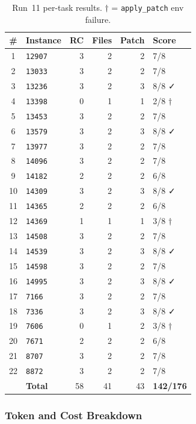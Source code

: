 \begin{table}[h]
\centering
\small
\caption{Run~11 per-task results.  $\dagger$ = \texttt{apply\_patch} env failure.}\label{tab:r11-tasks}
\setlength{\tabcolsep}{4pt}
\begin{tabular}{clrrrl}
\toprule
\textbf{\#} & \textbf{Instance} & \textbf{RC} & \textbf{Files} & \textbf{Patch} & \textbf{Score} \\
\midrule
 1 & \texttt{12907} & 3 & 2 & 2 & 7/8 \\
 2 & \texttt{13033} & 3 & 2 & 2 & 7/8 \\
 3 & \texttt{13236} & 3 & 2 & 3 & 8/8 ✓ \\
 4 & \texttt{13398} & 0 & 1 & 1 & 2/8 $\dagger$ \\
 5 & \texttt{13453} & 3 & 2 & 2 & 7/8 \\
 6 & \texttt{13579} & 3 & 2 & 3 & 8/8 ✓ \\
 7 & \texttt{13977} & 3 & 2 & 2 & 7/8 \\
 8 & \texttt{14096} & 3 & 2 & 2 & 7/8 \\
 9 & \texttt{14182} & 2 & 2 & 2 & 6/8 \\
10 & \texttt{14309} & 3 & 2 & 3 & 8/8 ✓ \\
11 & \texttt{14365} & 2 & 2 & 2 & 6/8 \\
12 & \texttt{14369} & 1 & 1 & 1 & 3/8 $\dagger$ \\
13 & \texttt{14508} & 3 & 2 & 2 & 7/8 \\
14 & \texttt{14539} & 3 & 2 & 3 & 8/8 ✓ \\
15 & \texttt{14598} & 3 & 2 & 2 & 7/8 \\
16 & \texttt{14995} & 3 & 2 & 3 & 8/8 ✓ \\
17 & \texttt{7166}  & 3 & 2 & 2 & 7/8 \\
18 & \texttt{7336}  & 3 & 2 & 3 & 8/8 ✓ \\
19 & \texttt{7606}  & 0 & 1 & 2 & 3/8 $\dagger$ \\
20 & \texttt{7671}  & 2 & 2 & 2 & 6/8 \\
21 & \texttt{8707}  & 3 & 2 & 2 & 7/8 \\
22 & \texttt{8872}  & 3 & 2 & 2 & 7/8 \\
\midrule
   & \textbf{Total} & 58 & 41 & 43 & \textbf{142/176} \\
\bottomrule
\end{tabular}
\end{table}

\subsubsection{Token and Cost Breakdown}


